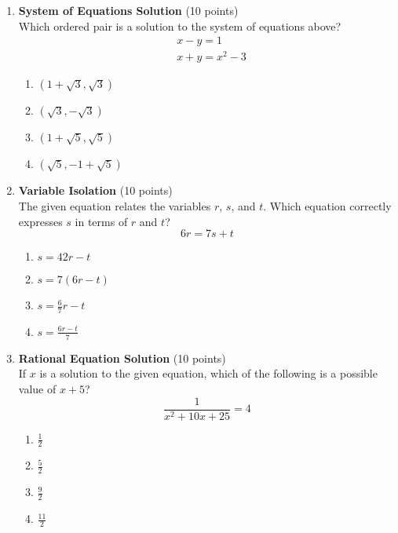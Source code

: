 \begin{enumerate}
  \item \textbf{System of Equations Solution} (10 points)\\
  Which ordered pair is a solution to the system of equations above?
  \[
  \begin{aligned}
  & x-y=1 \\
  & x+y=x^{2}-3
  \end{aligned}
  \]
  \begin{enumerate}[label=(\Alph*)]
    \item $(1+\sqrt{3}, \sqrt{3})$
    \item $(\sqrt{3},-\sqrt{3})$
    \item $(1+\sqrt{5}, \sqrt{5})$
    \item $(\sqrt{5},-1+\sqrt{5})$
  \end{enumerate}
  \begin{subanswer}
  \end{subanswer}
  
  \newpage

  \item \textbf{Variable Isolation} (10 points)\\
  The given equation relates the variables $r$, $s$, and $t$. Which equation correctly expresses $s$ in terms of $r$ and $t$?
  \[
  6 r=7 s+t
  \]
  \begin{enumerate}[label=(\Alph*)]
    \item $s=42 r-t$
    \item $s=7(6 r-t)$
    \item $s=\frac{6}{7} r-t$
    \item $s=\frac{6 r-t}{7}$
  \end{enumerate}
  \begin{subanswer}
  \end{subanswer}

  \item \textbf{Rational Equation Solution} (10 points)\\
  If $x$ is a solution to the given equation, which of the following is a possible value of $x+5$?
  \[
  \frac{1}{x^{2}+10 x+25}=4
  \]
  \begin{enumerate}[label=(\Alph*)]
    \item $\frac{1}{2}$
    \item $\frac{5}{2}$
    \item $\frac{9}{2}$
    \item $\frac{11}{2}$
  \end{enumerate}
  \begin{subanswer}
  \end{subanswer}


\end{enumerate}
